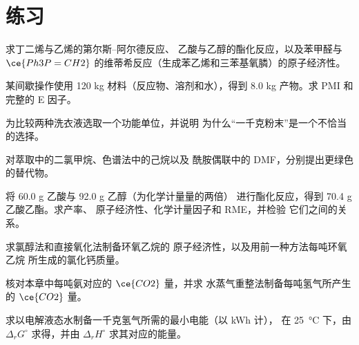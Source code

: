 \section{练习}

\begin{exercise}[$\star$]\label{exo:b3:green-industrial:1}
求丁二烯与乙烯的第尔斯–阿尔德反应、
乙酸与乙醇的酯化反应，以及苯甲醛与
$\ce{Ph3P=CH2}$ 的维蒂希反应（生成苯乙烯和三苯基氧膦）的原子经济性。
\end{exercise}

\begin{exercise}[$\star$]\label{exo:b3:green-industrial:2}
某间歇操作使用 120 kg 材料（反应物、溶剂和水），得到
8.0 kg 产物。求 PMI 和完整的 E 因子。
\end{exercise}

\begin{exercise}[$\star$]\label{exo:b3:green-industrial:3}
为比较两种洗衣液选取一个功能单位，并说明
为什么“一千克粉末”是一个不恰当的选择。
\end{exercise}

\begin{exercise}[$\star$]\label{exo:b3:green-industrial:4}
对萃取中的二氯甲烷、色谱法中的己烷以及
酰胺偶联中的 DMF，分别提出更绿色的替代物。
\end{exercise}

\begin{exercise}[$\star\star$]\label{exo:b3:green-industrial:5}
将 60.0 g 乙酸与 92.0 g 乙醇（为化学计量量的两倍）
进行酯化反应，得到 70.4 g 乙酸乙酯。求产率、
原子经济性、化学计量因子和 RME，并检验
它们之间的关系。
\end{exercise}

\begin{exercise}[$\star\star$]\label{exo:b3:green-industrial:6}
求氯醇法和直接氧化法制备环氧乙烷的
原子经济性，以及用前一种方法每吨环氧乙烷
所生成的氯化钙质量。
\end{exercise}

\begin{exercise}[$\star\star$]\label{exo:b3:green-industrial:7}
核对本章中每吨氨对应的 $\ce{CO2}$ 量，并求
水蒸气重整法制备每吨氢气所产生的 $\ce{CO2}$ 量。
\end{exercise}

\begin{exercise}[$\star\star$]\label{exo:b3:green-industrial:8}
求以电解液态水制备一千克氢气所需的最小电能（以 kWh 计），
在 \qty{25}{\celsius} 下，由 $\Delta_rG^\circ$ 求得，并由 $\Delta_rH^\circ$ 求其对应的能量。
\end{exercise}

